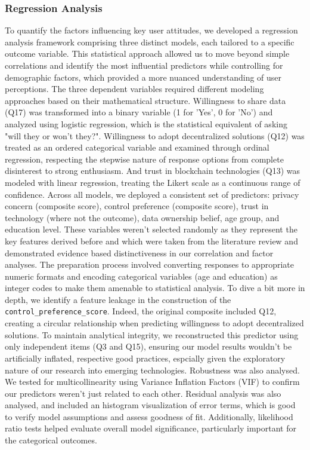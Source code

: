	\subsubsection{Regression Analysis}
	To quantify the factors influencing key user attitudes, we developed a regression analysis framework comprising three distinct models, each tailored to a specific outcome variable. This statistical approach allowed us to move beyond simple correlations and identify the most influential predictors while controlling for demographic factors, which provided a more nuanced understanding of user perceptions.
	The three dependent variables required different modeling approaches based on their mathematical structure. Willingness to share data (Q17) was transformed into a binary variable (1 for 'Yes', 0 for 'No') and analyzed using logistic regression, which is the statistical equivalent of asking "will they or won't they?".
	Willingness to adopt decentralized solutions (Q12) was treated as an ordered categorical variable and examined through ordinal regression, respecting the stepwise nature of response options from complete disinterest to strong enthusiasm. And trust in blockchain technologies (Q13) was modeled with linear regression, treating the Likert scale as a continuous range of confidence.
	Across all models, we deployed a consistent set of predictors: privacy concern (composite score), control preference (composite score), trust in technology (where not the outcome), data ownership belief, age group, and education level. These variables weren't selected randomly as they represent the key features derived before and which were taken from the literature review and demonstrated evidence based distinctiveness in our correlation and factor analyses. The preparation process involved converting responses to appropriate numeric formats and encoding categorical variables (age and education) as integer codes to make them amenable to statistical analysis.
	To dive a bit more in depth, we identify a feature leakage in the construction of the \texttt{control\_preference\_score}. Indeed, the original composite included Q12, creating a circular relationship when predicting willingness to adopt decentralized solutions. To maintain analytical integrity, we reconstructed this predictor using only independent items (Q3 and Q15), ensuring our model results wouldn't be artificially inflated, respective good practices, espcially given the exploratory nature of our research into emerging technologies.
	Robustness was also  analysed. We tested for multicollinearity using Variance Inflation Factors (VIF) to confirm our predictors weren't just related to each other. Residual analysis was also analysed, and included an histogram visualization of error terms, which is good to verify model assumptions and assess goodness of fit. Additionally, likelihood ratio tests helped evaluate overall model significance, particularly important for the categorical outcomes.
	
